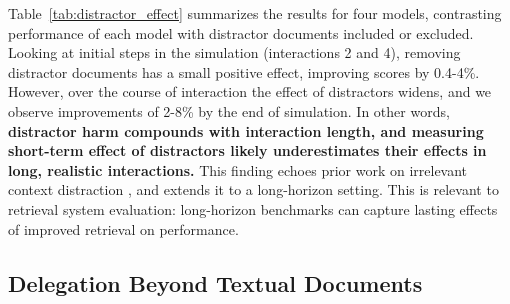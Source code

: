 \documentclass{article} %
\begin{document}
Table~\ref{tab:distractor_effect} summarizes the results for four models, contrasting performance of each model with distractor documents included or excluded. Looking at initial steps in the simulation (interactions 2 and 4), removing distractor documents has a small positive effect, improving scores by 0.4-4\%. However, over the course of interaction the effect of distractors widens, and we observe improvements of 2-8\% by the end of simulation. In other words, \textbf{distractor harm compounds with interaction length, and measuring short-term effect of distractors likely underestimates their effects in long, realistic interactions.} This finding echoes prior work on irrelevant context distraction \citep{Shi2023LargeLM}, and extends it to a long-horizon setting. This is relevant to retrieval system evaluation: long-horizon benchmarks can capture lasting effects of improved retrieval on performance.


\subsection{Delegation Beyond Textual Documents} \label{sec:image_domain}

\begin{table}[t]
\vspace{-2\intextsep}
\begin{minipage}[t]{0.48\textwidth}
\vspace{0pt}
\centering

\caption{Distractor effect on degradation, with distractor (top) and without (indented). Removing distractors consistently improves scores across all models and rounds.}
\label{tab:distractor_effect}
\end{minipage}\hfill
\begin{minipage}[t]{0.48\textwidth}
\vspace{0pt}
\centering

\caption{Image editing relay results for nine image generation models. Current models degrade images significantly faster than LLMs degrade text.}
\label{tab:image_domain}
\end{minipage}
\vspace{-1\intextsep}
\end{table}
\end{document}
